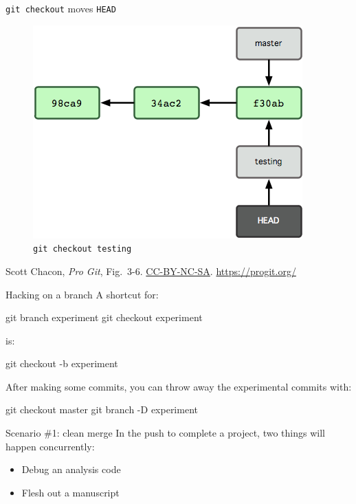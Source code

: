 \begin{frame}{\texttt{git checkout} moves \texttt{HEAD}}
  \begin{figure}
    \includegraphics[scale=0.8]{18333fig0306-tn.png}
    \\ \texttt{git checkout testing}
  \end{figure}
  \footnotesize{Scott Chacon,
    \emph{Pro Git},
    Fig.~3-6.
    \href{https://creativecommons.org/licenses/by-nc-sa/3.0/legalcode}{CC-BY-NC-SA}.
    \href{https://progit.org/}{https://progit.org/}}
\end{frame}

\begin{frame}[fragile]{Hacking on a branch}
  A shortcut for:

  \begin{gitCommand}
git branch experiment
git checkout experiment
  \end{gitCommand}

  is:

  \begin{gitCommand}git checkout -b experiment\end{gitCommand}

  After making some commits, you can throw away the experimental commits with:

  \begin{gitCommand}
git checkout master
git branch -D experiment
  \end{gitCommand}

\end{frame}

\begin{frame}{Scenario \#1: clean merge}
  In the push to complete a project, two things will happen concurrently:

  \begin{itemize}
    \item Debug an analysis code
    \item Flesh out a manuscript
  \end{itemize}
\end{frame}

